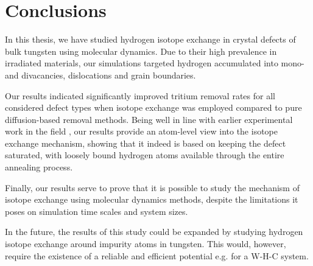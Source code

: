 \chapter{Conclusions}

In this thesis, we have studied hydrogen isotope exchange in crystal defects of bulk tungsten using molecular dynamics. 
Due to their high prevalence in irradiated materials, our simulations targeted hydrogen accumulated into mono- and divacancies, dislocations and grain boundaries.  

Our results indicated significantly improved tritium removal rates for all considered defect types when isotope exchange was employed compared to pure diffusion-based removal methods.
Being well in line with earlier experimental work in the field \cite{ahlgren2019hydrogen}, our results provide an atom-level view into the isotope exchange mechanism, showing that it indeed is based on keeping the defect saturated, with loosely bound hydrogen atoms available through the entire annealing process.

Finally, our results serve to prove that it is possible to study the mechanism of isotope exchange using molecular dynamics methods, despite the limitations it poses on simulation time scales and system sizes.

In the future, the results of this study could be expanded by studying hydrogen isotope exchange around impurity atoms in tungsten.
This would, however, require the existence of a reliable and efficient potential e.g. for a W-H-C system.   
